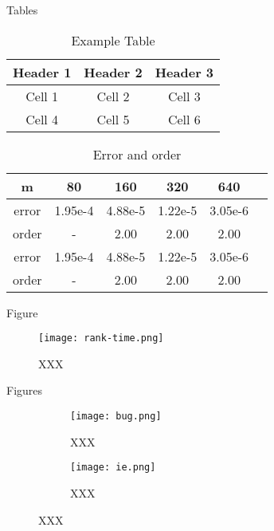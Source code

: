 \documentclass[compress,aspectratio=43]{beamer}
\begin{document}
\begin{frame}{Tables}
    \begin{table}
        \caption{Example Table}
        \begin{tabular}{|c|c|c|}
            \hline
            Header 1 & Header 2 & Header 3 \\
            \hline
            Cell 1   & Cell 2   & Cell 3   \\
            Cell 4   & Cell 5   & Cell 6   \\
            \hline
        \end{tabular}
    \end{table}

    \begin{table}[ht]
        \centering
        \caption{Error and order}\label{tab:1}
        \begin{tabular}{c|ccccc}
            \hline
            m     & 80      & 160     & 320     & 640     \\
            \hline
            error & 1.95e-4 & 4.88e-5 & 1.22e-5 & 3.05e-6 \\
            order & -       & 2.00    & 2.00    & 2.00    \\
            \hline
            error & 1.95e-4 & 4.88e-5 & 1.22e-5 & 3.05e-6 \\
            order & -       & 2.00    & 2.00    & 2.00    \\
            \hline
        \end{tabular}
    \end{table}
\end{frame}

\begin{frame}{Figure}
    \begin{figure}
        \texttt{[image: rank-time.png]}
        \caption{XXX}
    \end{figure}
\end{frame}

\begin{frame}{Figures}
    \begin{figure}[htbp]
        \centering
        \begin{subfigure}[b]{0.45\textwidth}
            \centering
            \texttt{[image: bug.png]}
            \caption{XXX}\label{fig:subfig-a}
        \end{subfigure}
        \begin{subfigure}[b]{0.45\textwidth}
            \centering
            \texttt{[image: ie.png]}
            \caption{XXX}\label{fig:subfig-b}
        \end{subfigure}
        \caption{XXX}\label{fig:example}
    \end{figure}
\end{frame}
\end{document}
